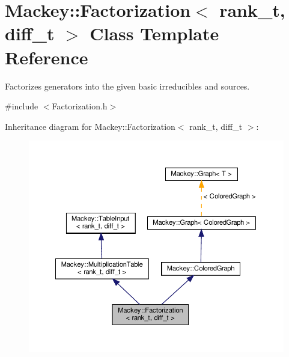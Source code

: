 \hypertarget{classMackey_1_1Factorization}{}\section{Mackey\+:\+:Factorization$<$ rank\+\_\+t, diff\+\_\+t $>$ Class Template Reference}
\label{classMackey_1_1Factorization}


Factorizes generators into the given basic irreducibles and sources.  




{\ttfamily \#include $<$Factorization.\+h$>$}



Inheritance diagram for Mackey\+:\+:Factorization$<$ rank\+\_\+t, diff\+\_\+t $>$\+:\nopagebreak
\begin{figure}[H]
\begin{center}
\leavevmode
\includegraphics[width=350pt]{classMackey_1_1Factorization__inherit__graph}
\end{center}
\end{figure}


